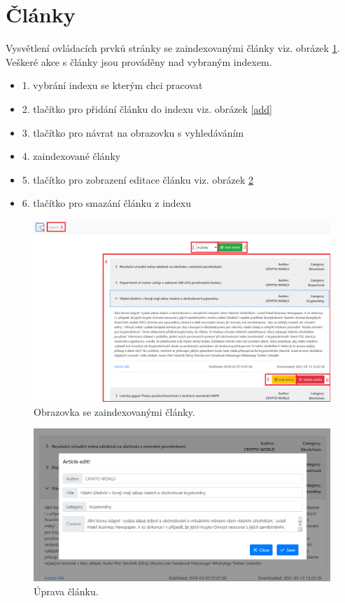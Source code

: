 \documentclass[
12pt,
a4paper,
pdftex,
czech,
titlepage
]{report}
\begin{document}
\section{Články}
Vysvětlení ovládacích prvků stránky se zaindexovanými články viz. obrázek \ref{articles}. Veškeré akce s články jsou prováděny nad vybraným indexem.
\begin{itemize}
    \item 1. vybrání indexu se kterým chci pracovat
    \item 2. tlačítko pro přidání článku do indexu viz. obrázek \ref{add}
    \item 3. tlačítko pro návrat na obrazovku s vyhledáváním
    \item 4. zaindexované články
    \item 5. tlačítko pro zobrazení editace článku viz. obrázek \ref{edit}
    \item 6. tlačítko pro smazání článku z indexu
\end{itemize}
\begin{figure}
    \centering
	\includegraphics[width=13.5cm]{img/IR_articles.png}
	\caption{Obrazovka se zaindexovanými články.}
	\label{articles}
\end{figure}
\begin{figure}
    \centering
	\includegraphics[width=13.5cm]{img/IR_article_edit.png}
	\caption{Úprava článku.}
	\label{edit}
\end{figure}
\end{document}
